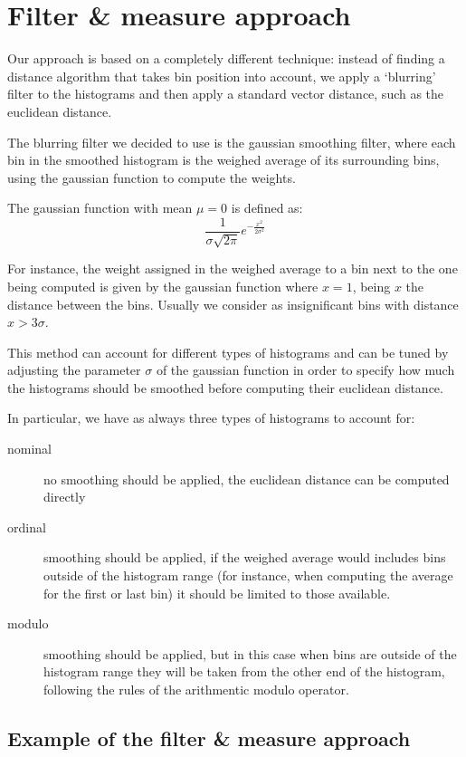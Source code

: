 \section{Filter \& measure approach}

Our approach is based on a completely different technique: instead of finding a distance algorithm that takes bin position into account, we apply a `blurring' filter to the histograms and then apply a standard vector distance, such as the euclidean distance.

The blurring filter we decided to use is the gaussian smoothing filter, where each bin in the smoothed histogram is the weighed average of its surrounding bins, using the gaussian function to compute the weights.

The gaussian function with mean $\mu = 0$ is defined as:
\begin{displaymath}
  \frac{1}{\sigma\sqrt{2\pi}}e^{-\frac{x^2}{2\sigma^2}}
\end{displaymath}

For instance, the weight assigned in the weighed average to a bin next to the one being computed is given by the gaussian function where $x = 1$, being $x$ the distance between the bins. Usually we consider as insignificant bins with distance $x > 3\sigma$.

This method can account for different types of histograms and can be tuned by adjusting the parameter $\sigma$ of the gaussian function in order to specify how much the histograms should be smoothed before computing their euclidean distance.

In particular, we have as always three types of histograms to account for:

\begin{description}
  \item[nominal] no smoothing should be applied, the euclidean distance can be computed directly
  \item[ordinal] smoothing should be applied, if the weighed average would includes bins outside of the histogram range (for instance, when computing the average for the first or last bin) it should be limited to those available.
  \item[modulo] smoothing should be applied, but in this case when bins are outside of the histogram range they will be taken from the other end of the histogram, following the rules of the arithmentic modulo operator.
\end{description}

\subsection{Example of the filter \& measure approach}

